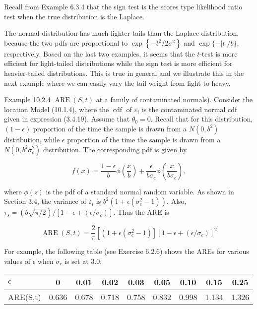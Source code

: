 Recall from Example 6.3.4 that the sign test is the scores type likelihood ratio test when the true distribution is the Laplace.

The normal distribution has much lighter tails than the Laplace distribution, because the two pdfs are proportional to $\exp \left\{-t^{2} / 2 \sigma^{2}\right\}$ and $\exp \{-|t| / b\}$, respectively. Based on the last two examples, it seems that the $t$-test is more efficient for light-tailed distributions while the sign test is more efficient for heavier-tailed distributions. This is true in general and we illustrate this in the next example where we can easily vary the tail weight from light to heavy.

Example 10.2.4 $\operatorname{ARE}(S, t)$ at a family of contaminated normals). Consider the location Model (10.1.4), where the $\operatorname{cdf}$ of $\varepsilon_{i}$ is the contaminated normal cdf given in expression (3.4.19). Assume that $\theta_{0}=0$. Recall that for this distribution, $(1-\epsilon)$ proportion of the time the sample is drawn from a $N\left(0, b^{2}\right)$ distribution, while $\epsilon$ proportion of the time the sample is drawn from a $N\left(0, b^{2} \sigma_{c}^{2}\right)$ distribution. The corresponding pdf is given by


\begin{equation*}
f(x)=\frac{1-\epsilon}{b} \phi\left(\frac{x}{b}\right)+\frac{\epsilon}{b \sigma_{c}} \phi\left(\frac{x}{b \sigma_{c}}\right), \tag{10.2.30}
\end{equation*}


where $\phi(z)$ is the pdf of a standard normal random variable. As shown in Section 3.4, the variance of $\varepsilon_{i}$ is $b^{2}\left(1+\epsilon\left(\sigma_{c}^{2}-1\right)\right)$. Also, $\tau_{s}=(b \sqrt{\pi / 2}) /\left[1-\epsilon+\left(\epsilon / \sigma_{c}\right)\right]$. Thus the ARE is


\begin{equation*}
\operatorname{ARE}(S, t)=\frac{2}{\pi}\left[\left(1+\epsilon\left(\sigma_{c}^{2}-1\right)\right]\left[1-\epsilon+\left(\epsilon / \sigma_{c}\right)\right]^{2}\right. \tag{10.2.31}
\end{equation*}


For example, the following table (see Exercise 6.2.6) shows the AREs for various values of $\epsilon$ when $\sigma_{c}$ is set at 3.0:

\begin{center}
\begin{tabular}{|l|c|c|c|c|c|c|c|c|}
\hline
$\epsilon$ & 0 & 0.01 & 0.02 & 0.03 & 0.05 & 0.10 & 0.15 & 0.25 \\
\hline
ARE(S,t) & 0.636 & 0.678 & 0.718 & 0.758 & 0.832 & 0.998 & 1.134 & 1.326 \\
\hline
\end{tabular}
\end{center}


